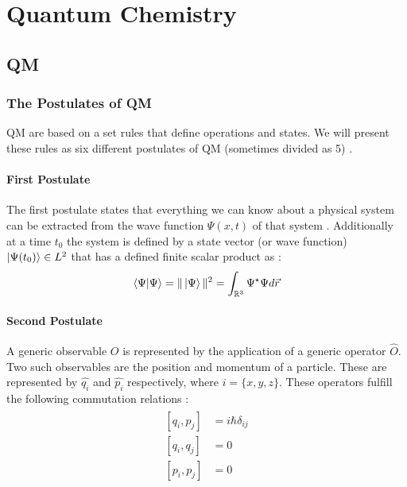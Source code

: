 \documentclass[../master_thesis.tex]{subfiles}
\begin{document}
\chapter{Quantum Chemistry}
\section{\ac{QM}}

\subsection{The Postulates of \ac{QM}}

\ac{QM} are based on a set rules that define operations and states. We will
present these rules as six different postulates of \ac{QM} (sometimes divided
as 5) \cite{Atkins:2011, Cohen:1973}.

\subsubsection{First Postulate}
The first postulate states that everything we can know about a physical system
can be extracted from the wave function $\Psi(x, t)$ of that system
\cite{Atkins:2011}. Additionally at a time $t_0$ the system is defined by
a state vector (or wave function) $\ket{\Psi(t_0)}\in L^2$ that has a defined
finite scalar product as \cite{Cohen:1973}:
\begin{equation}
  \braket{\Psi|\Psi} = \|\ket{\Psi}\|^2 =  \int_{\mathbb{R}^3}\Psi^\star\Psi d\vec{r}
\end{equation}

\subsubsection{Second Postulate}
A generic observable $O$ is represented by the application of a generic operator
$\hat{O}$. Two such observables are the position and momentum of a particle. These are
represented by $\hat{q_i}$ and $\hat{p_i}$ respectively, where
$i = \{x, y, z\}$. These operators fulfill the following commutation relations
\cite{Atkins:2011, Cohen:1973}:
\begin{align}
  \begin{split}
    [q_i, p_j] &= i \hbar \delta_{ij}\\
    [q_i, q_j] &= 0 \\
    [p_i, p_j] &= 0
  \end{split}
\end{align}
\end{document}
